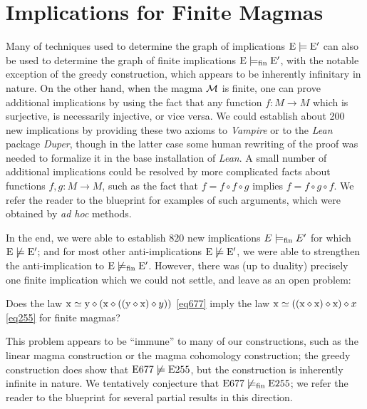 \section{Implications for Finite Magmas}\label{austin-sec}

Many of techniques used to determine the graph of implications $\mathrm{E} \models \mathrm{E}'$ can also be used to determine the graph of finite implications $\mathrm{E} \models_{\mathrm{fin}} \mathrm{E}'$, with the notable exception of the greedy construction, which appears to be inherently infinitary in nature.  On the other hand, when the magma ${\mathcal{M}}$ is finite, one can prove additional implications by using the fact that any function $f \colon M \to M$ which is surjective, is necessarily injective, or vice versa.  We could establish about 200 new implications by providing these two axioms to \emph{Vampire} or to the \emph{Lean} package \emph{Duper}, though in the latter case some human rewriting of the proof was needed to formalize it in the base installation of \emph{Lean}.  A small number of additional implications could be resolved by more complicated facts about functions $f,g \colon M \to M$, such as the fact that $f = f \circ f \circ g$ implies $f = f \circ g \circ f$.  We refer the reader to the blueprint for examples of such arguments, which were obtained by \emph{ad hoc} methods.

In the end, we were able to establish $820$ new implications $E \models_{\mathrm{fin}} E'$ for which $\mathrm{E} \not \models \mathrm{E}'$; and for most other anti-implications $\mathrm{E} \not \models \mathrm{E}'$, we were able to strengthen the anti-implication to $\mathrm{E} \not \models_{\mathrm{fin}} \mathrm{E}'$.  However, there was (up to duality) precisely one finite implication which we could not settle, and leave as an open problem:

\begin{problem}  Does the law $\mathrm{x} \simeq \mathrm{y} \diamond (\mathrm{x} \diamond ((\mathrm{y} \diamond \mathrm{x}) \diamond y))$ \eqref{eq677} imply the law $\mathrm{x} \simeq ((\mathrm{x} \diamond \mathrm{x}) \diamond \mathrm{x}) \diamond x$ \eqref{eq255} for finite magmas?
\end{problem}

This problem appears to be ``immune'' to many of our constructions, such as the linear magma construction or the magma cohomology construction; the greedy construction does show that $\mathrm{E}677 \not \models \mathrm{E}255$, but the construction is inherently infinite in nature.  We tentatively conjecture that $\mathrm{E}677 \not \models_{\mathrm{fin}} \mathrm{E}255$; we refer the reader to the blueprint for several partial results in this direction.
